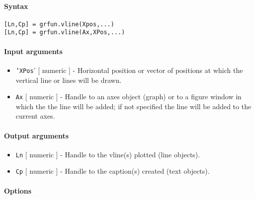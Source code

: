 


	\paragraph{Syntax}

\begin{verbatim}
[Ln,Cp] = grfun.vline(Xpos,...)
[Ln,Cp] = grfun.vline(Ax,XPos,...)
\end{verbatim}

\paragraph{Input arguments}

\begin{itemize}
\item
  \texttt{'XPos}' {[} numeric {]} - Horizontal position or vector of
  positions at which the vertical line or lines will be drawn.
\item
  \texttt{Ax} {[} numeric {]} - Handle to an axes object (graph) or to a
  figure window in which the the line will be added; if not specified
  the line will be added to the current axes.
\end{itemize}

\paragraph{Output arguments}

\begin{itemize}
\item
  \texttt{Ln} {[} numeric {]} - Handle to the vline(s) plotted (line
  objects).
\item
  \texttt{Cp} {[} numeric {]} - Handle to the caption(s) created (text
  objects).
\end{itemize}

\paragraph{Options}

